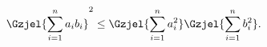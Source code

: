 $$
\Gzjel{ \sum_{i=1}^{n} a_{i}b_{i} }^2 \le 
\Gzjel{ \sum_{i=1}^{n} a_{i}^2 } \Gzjel{ \sum_{i=1}^n b_{i}^{2} }.
$$
